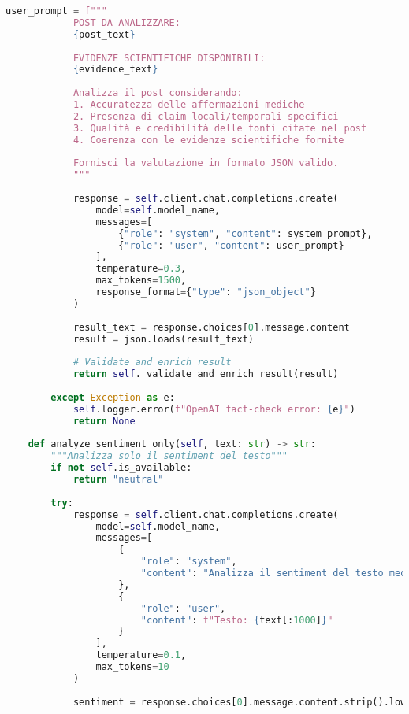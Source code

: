 \documentclass[12pt,a4paper]{report}
\begin{document}
\begin{lstlisting}[language=Python, caption=OpenAI Service Provider]
            user_prompt = f"""
            POST DA ANALIZZARE:
            {post_text}
            
            EVIDENZE SCIENTIFICHE DISPONIBILI:
            {evidence_text}
            
            Analizza il post considerando:
            1. Accuratezza delle affermazioni mediche
            2. Presenza di claim locali/temporali specifici
            3. Qualità e credibilità delle fonti citate nel post
            4. Coerenza con le evidenze scientifiche fornite
            
            Fornisci la valutazione in formato JSON valido.
            """
            
            response = self.client.chat.completions.create(
                model=self.model_name,
                messages=[
                    {"role": "system", "content": system_prompt},
                    {"role": "user", "content": user_prompt}
                ],
                temperature=0.3,
                max_tokens=1500,
                response_format={"type": "json_object"}
            )
            
            result_text = response.choices[0].message.content
            result = json.loads(result_text)
            
            # Validate and enrich result
            return self._validate_and_enrich_result(result)
            
        except Exception as e:
            self.logger.error(f"OpenAI fact-check error: {e}")
            return None
    
    def analyze_sentiment_only(self, text: str) -> str:
        """Analizza solo il sentiment del testo"""
        if not self.is_available:
            return "neutral"
        
        try:
            response = self.client.chat.completions.create(
                model=self.model_name,
                messages=[
                    {
                        "role": "system",
                        "content": "Analizza il sentiment del testo medico. Rispondi solo con: positivo, negativo, o neutro."
                    },
                    {
                        "role": "user", 
                        "content": f"Testo: {text[:1000]}"
                    }
                ],
                temperature=0.1,
                max_tokens=10
            )
            
            sentiment = response.choices[0].message.content.strip().lower()
            

\end{lstlisting}
\end{document}
